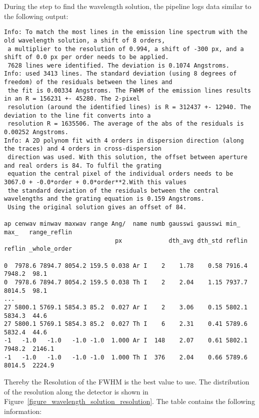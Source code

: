 \documentclass[10pt,a4paper]{article}
\begin{document}
During the step to find the wavelength solution, the pipeline logs data similar to the following output:
\begin{lstlisting}[style=base, basicstyle=\tiny]
Info: To match the most lines in the emission line spectrum with the old wavelength solution, a shift of 8 orders,
 a multiplier to the resolution of 0.994, a shift of -300 px, and a shift of 0.0 px per order needs to be applied.
 7628 lines were identified. The deviation is 0.1074 Angstroms.
Info: used 3413 lines. The standard deviation (using 8 degrees of freedom) of the residuals between the lines and
 the fit is 0.00334 Angstroms. The FWHM of the emission lines results in an R = 156231 +- 45280. The 2-pixel
 resolution (around the identified lines) is R = 312437 +- 12940. The deviation to the line fit converts into a
 resolution R = 1635506. The average of the abs of the residuals is 0.00252 Angstroms. 
Info: A 2D polynom fit with 4 orders in dispersion direction (along the traces) and 4 orders in cross-dispersion
 direction was used. With this solution, the offset between aperture and real orders is 84. To fulfil the grating
 equation the central pixel of the individual orders needs to be 3067.0 + -0.0*order + 0.0*order**2.With this values
 the standard deviation of the residuals between the central wavelengths and the grating equation is 0.159 Angstroms.
 Using the original solution gives an offset of 84.

ap cenwav minwav maxwav range Ang/  name numb gausswi gausswi min_   max_   range_reflin
                               px             dth_avg dth_std reflin reflin _whole_order

0  7978.6 7894.7 8054.2 159.5 0.038 Ar I    2    1.78    0.58 7916.4 7948.2  98.1
0  7978.6 7894.7 8054.2 159.5 0.038 Th I    2    2.04    1.15 7937.7 8014.5  98.1
...
27 5800.1 5769.1 5854.3 85.2  0.027 Ar I    2    3.06    0.15 5802.1 5834.3  44.6
27 5800.1 5769.1 5854.3 85.2  0.027 Th I    6    2.31    0.41 5789.6 5832.4  44.6
-1   -1.0   -1.0   -1.0 -1.0  1.000 Ar I  148    2.07    0.61 5802.1 7948.2  2146.1
-1   -1.0   -1.0   -1.0 -1.0  1.000 Th I  376    2.04    0.66 5789.6 8014.5  2224.9
\end{lstlisting} 
Thereby the Resolution of the FWHM is the best value to use. The distribution of the resolution along the detector is shown in Figure~\ref{figure_wavelength_solution_resolution}. The table contains the following information:
\end{document}

